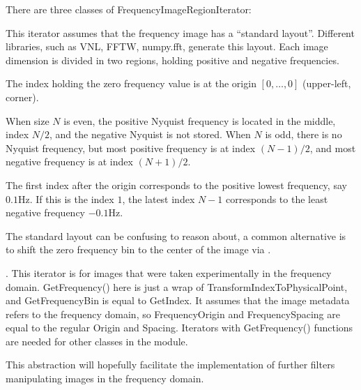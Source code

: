 There are three classes of FrequencyImageRegionIterator:
\begin{description}[topsep=0pt,font=\normalfont\textbullet\space]
  \item [FFTLayout:] \newline
    This iterator assumes that the frequency image has a ``standard layout''. Different libraries, such as VNL, FFTW, numpy.fft, generate this layout. Each image dimension is divided in two regions, holding positive and negative frequencies.
    \begin{description}[topsep=0pt,font=\normalfont-\space]
      \item[ZeroFrequency:] The index holding the zero frequency value is at the origin $[0,\ldots,0]$ (upper-left, corner).
      \item[Nyquist:] When size $N$ is even, the positive Nyquist frequency is located in the middle, index $N/2$, and the negative Nyquist is not stored.
    When $N$ is odd, there is no Nyquist frequency, but most positive frequency is at index $(N-1)/2$, and most negative frequency is at index $(N+1)/2$.
    \end{description}
    The first index after the origin corresponds to the positive lowest frequency, say $0.1 \text{Hz}$. If this is the index $1$, the latest index $N-1$ corresponds to the least negative frequency $-0.1 \text{Hz}$.

  \item [ShiftedFFTLayout:] \newline
    The standard layout can be confusing to reason about, a common alternative is to shift the zero frequency bin to the center of the image via .
  \item [Regular:] .\newline
    This iterator is for images that were taken experimentally in the frequency domain. GetFrequency() here is just a wrap of TransformIndexToPhysicalPoint, and GetFrequencyBin is equal to GetIndex. It assumes that the image metadata refers to the frequency domain, so FrequencyOrigin and FrequencySpacing are equal to the regular Origin and Spacing.
    Iterators with GetFrequency() functions are needed for other classes in the module.
\end{description}

This abstraction will hopefully facilitate the implementation of further filters manipulating images in the frequency domain.

